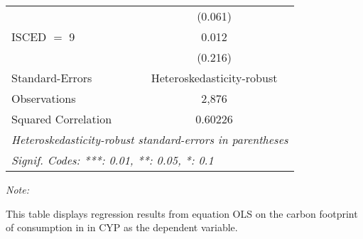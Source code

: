 \begin{table}[htbp!]
\begin{adjustbox}{width = 1\textwidth, max height = 0.95\textheight, center}
\begin{threeparttable}[b]
\begin{tabular}{lc}
                                & (0.061)\\   
            ISCED $=$ 9         & 0.012\\   
                                & (0.216)\\   
            \midrule 
            Standard-Errors     & Heteroskedasticity-robust \\   
            Observations        & 2,876\\  
            Squared Correlation & 0.60226\\  
            \midrule \midrule
            \multicolumn{2}{l}{\emph{Heteroskedasticity-robust standard-errors in parentheses}}\\
            \multicolumn{2}{l}{\emph{Signif. Codes: ***: 0.01, **: 0.05, *: 0.1}}\\
         \end{tabular}
         
         \begin{tablenotes}\item \medskip \textit{Note:}
            \item This table displays regression results from equation OLS on the carbon footprint of consumption in  in CYP as the dependent variable.  
         \end{tablenotes}
      \end{threeparttable}
   \end{adjustbox}
\end{table}


